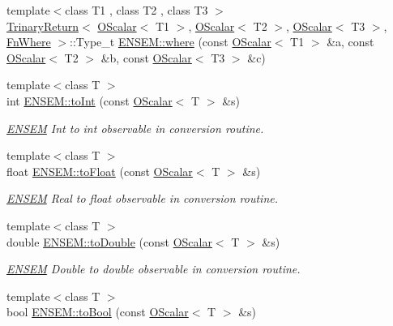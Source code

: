 \begin{DoxyCompactItemize}
\item 
{\footnotesize template$<$class T1 , class T2 , class T3 $>$ }\\\mbox{\hyperlink{structENSEM_1_1TrinaryReturn}{Trinary\+Return}}$<$ \mbox{\hyperlink{classENSEM_1_1OScalar}{O\+Scalar}}$<$ T1 $>$, \mbox{\hyperlink{classENSEM_1_1OScalar}{O\+Scalar}}$<$ T2 $>$, \mbox{\hyperlink{classENSEM_1_1OScalar}{O\+Scalar}}$<$ T3 $>$, \mbox{\hyperlink{structENSEM_1_1FnWhere}{Fn\+Where}} $>$\+::Type\+\_\+t \mbox{\hyperlink{group__obsscalar_gacb54937c6368c2a99fd2eaecc1221360}{E\+N\+S\+E\+M\+::where}} (const \mbox{\hyperlink{classENSEM_1_1OScalar}{O\+Scalar}}$<$ T1 $>$ \&a, const \mbox{\hyperlink{classENSEM_1_1OScalar}{O\+Scalar}}$<$ T2 $>$ \&b, const \mbox{\hyperlink{classENSEM_1_1OScalar}{O\+Scalar}}$<$ T3 $>$ \&c)
\item 
{\footnotesize template$<$class T $>$ }\\int \mbox{\hyperlink{group__obsscalar_ga700ca25f1dbaeb36065859d474b4dbeb}{E\+N\+S\+E\+M\+::to\+Int}} (const \mbox{\hyperlink{classENSEM_1_1OScalar}{O\+Scalar}}$<$ T $>$ \&s)
\begin{DoxyCompactList}\small\item\em \mbox{\hyperlink{namespaceENSEM}{E\+N\+S\+EM}} Int to int observable in conversion routine. \end{DoxyCompactList}\item 
{\footnotesize template$<$class T $>$ }\\float \mbox{\hyperlink{group__obsscalar_ga8a5fa51c51286eaa85647e050a9b3afd}{E\+N\+S\+E\+M\+::to\+Float}} (const \mbox{\hyperlink{classENSEM_1_1OScalar}{O\+Scalar}}$<$ T $>$ \&s)
\begin{DoxyCompactList}\small\item\em \mbox{\hyperlink{namespaceENSEM}{E\+N\+S\+EM}} Real to float observable in conversion routine. \end{DoxyCompactList}\item 
{\footnotesize template$<$class T $>$ }\\double \mbox{\hyperlink{group__obsscalar_gad40ee3f4578e710aa6f83e848e14282b}{E\+N\+S\+E\+M\+::to\+Double}} (const \mbox{\hyperlink{classENSEM_1_1OScalar}{O\+Scalar}}$<$ T $>$ \&s)
\begin{DoxyCompactList}\small\item\em \mbox{\hyperlink{namespaceENSEM}{E\+N\+S\+EM}} Double to double observable in conversion routine. \end{DoxyCompactList}\item 
{\footnotesize template$<$class T $>$ }\\bool \mbox{\hyperlink{group__obsscalar_ga8fa5feb767fc8b3814940792eddf13c8}{E\+N\+S\+E\+M\+::to\+Bool}} (const \mbox{\hyperlink{classENSEM_1_1OScalar}{O\+Scalar}}$<$ T $>$ \&s)

\end{DoxyCompactItemize}
